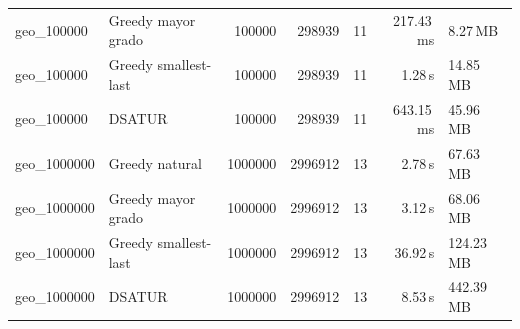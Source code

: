 \begin{table}[h]
\begin{tabular}{@{}llrrrrl@{}}
geo\_100000 & Greedy mayor grado & 100000 & 298939 & 11 & 217.43\,ms & 8.27\,MB\\
geo\_100000 & Greedy smallest-last & 100000 & 298939 & 11 & 1.28\,s & 14.85\,MB\\
geo\_100000 & DSATUR & 100000 & 298939 & 11 & 643.15\,ms & 45.96\,MB\\
\addlinespace
geo\_1000000 & Greedy natural & 1000000 & 2996912 & 13 & 2.78\,s & 67.63\,MB\\
geo\_1000000 & Greedy mayor grado & 1000000 & 2996912 & 13 & 3.12\,s & 68.06\,MB\\
geo\_1000000 & Greedy smallest-last & 1000000 & 2996912 & 13 & 36.92\,s & 124.23\,MB\\
geo\_1000000 & DSATUR & 1000000 & 2996912 & 13 & 8.53\,s & 442.39\,MB\\
\bottomrule
\end{tabular}
\end{table}
